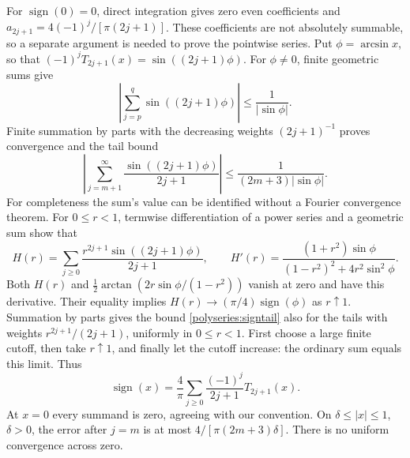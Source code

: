 \documentclass[11pt]{article}
\theoremstyle{remark}
\numberwithin{equation}{section}
\begin{document}
For $\operatorname{sign}(0)=0$, direct integration gives zero even
coefficients and
$a_{2j+1}=4(-1)^j/[\pi(2j+1)]$. These coefficients are not absolutely
summable, so a separate argument is needed to prove the pointwise
series. Put $\phi=\arcsin x$, so that
$(-1)^jT_{2j+1}(x)=\sin((2j+1)\phi)$. For $\phi\ne0$, finite geometric
sums give
\[
 \left|\sum_{j=p}^q\sin((2j+1)\phi)\right|
 \le\frac1{|\sin\phi|}.
\]
Finite summation by parts with the decreasing weights $(2j+1)^{-1}$
proves convergence and the tail bound
\begin{equation}\label{polyseries:signtail}
 \left|\sum_{j=m+1}^\infty
        \frac{\sin((2j+1)\phi)}{2j+1}\right|
 \le\frac1{(2m+3)|\sin\phi|}.
\end{equation}
For completeness the sum's value can be identified without a Fourier
convergence theorem. For $0\le r<1$, termwise differentiation of a
power series and a geometric sum show that
\[
 H(r)=\sum_{j\ge0}\frac{r^{2j+1}\sin((2j+1)\phi)}{2j+1},\qquad
 H'(r)=\frac{(1+r^2)\sin\phi}
 {(1-r^2)^2+4r^2\sin^2\phi}.
\]
Both $H(r)$ and
$\tfrac12\arctan(2r\sin\phi/(1-r^2))$ vanish at zero and have this
derivative. Their equality implies $H(r)\to(\pi/4)\operatorname{sign}(\phi)$
as $r\uparrow1$. Summation by parts gives the bound
\eqref{polyseries:signtail} also for the tails with weights
$r^{2j+1}/(2j+1)$, uniformly in $0\le r<1$. First choose a large
finite cutoff, then take $r\uparrow1$, and finally let the cutoff
increase: the ordinary sum equals this limit. Thus
\[
 \operatorname{sign}(x)=\frac4\pi\sum_{j\ge0}
            \frac{(-1)^j}{2j+1}T_{2j+1}(x).
\]
At $x=0$ every summand is zero, agreeing with our convention. On
$\delta\le|x|\le1$, $\delta>0$, the error after $j=m$ is at most
$4/[\pi(2m+3)\delta]$. There is no uniform convergence across zero.
\end{document}
